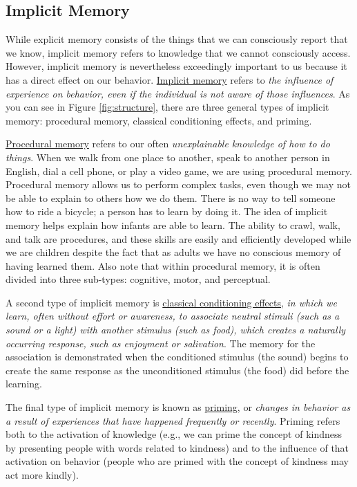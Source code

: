 \documentclass[
]{krantz}
\begin{document}
\subsection*{Implicit Memory}\label{implicit-memory}


While explicit memory consists of the things that we can consciously report that we know, implicit memory refers to knowledge that we cannot consciously access. However, implicit memory is nevertheless exceedingly important to us because it has a direct effect on our behavior. \hyperref[implicit-memory]{Implicit memory} refers to \emph{the influence of experience on behavior, even if the individual is not aware of those influences}. As you can see in Figure \ref{fig:structure}, there are three general types of implicit memory: procedural memory, classical conditioning effects, and priming.

\hyperref[procedural-memory]{Procedural memory} refers to our often \emph{unexplainable knowledge of how to do things}. When we walk from one place to another, speak to another person in English, dial a cell phone, or play a video game, we are using procedural memory. Procedural memory allows us to perform complex tasks, even though we may not be able to explain to others how we do them. There is no way to tell someone how to ride a bicycle; a person has to learn by doing it. The idea of implicit memory helps explain how infants are able to learn. The ability to crawl, walk, and talk are procedures, and these skills are easily and efficiently developed while we are children despite the fact that as adults we have no conscious memory of having learned them. Also note that within procedural memory, it is often divided into three sub-types: cognitive, motor, and perceptual.

A second type of implicit memory is \hyperref[classical-conditioning-effects]{classical conditioning effects}, \emph{in which we learn, often without effort or awareness, to associate neutral stimuli (such as a sound or a light) with another stimulus (such as food), which creates a naturally occurring response, such as enjoyment or salivation}. The memory for the association is demonstrated when the conditioned stimulus (the sound) begins to create the same response as the unconditioned stimulus (the food) did before the learning.

The final type of implicit memory is known as \hyperref[priming]{priming}, or \emph{changes in behavior as a result of experiences that have happened frequently or recently}. Priming refers both to the activation of knowledge (e.g., we can prime the concept of kindness by presenting people with words related to kindness) and to the influence of that activation on behavior (people who are primed with the concept of kindness may act more kindly).
\end{document}
